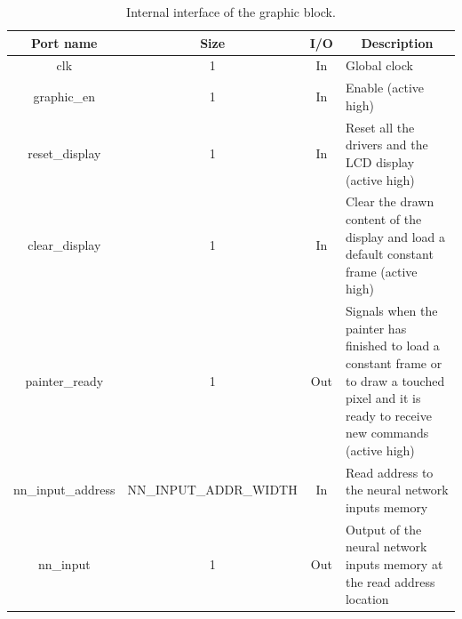 \documentclass[11pt]{report}
\begin{document}
\begin{table}[!h]
\renewcommand{\arraystretch}{1.5}
\centering
\begin{tabular}{|c|c|c|p{60mm}|}
\hline
\textbf{Port name}   & \textbf{Size}           & \textbf{I/O} & \multicolumn{1}{c|}{\textbf{Description}} \\ \hline
clk                  &  1                      & In & Global clock   \\ \hline
graphic\_en          &  1                      & In & Enable (active high)        \\ \hline
reset\_display       &  1                      & In & Reset all the drivers and the LCD display (active high)                     \\ \hline
clear\_display       &  1                      & In & Clear the drawn content of the display and load a default constant frame (active high)                      \\ \hline
painter\_ready       &  1                      & Out & Signals when the painter has finished to load a constant frame or to draw a touched pixel and it is ready to receive new commands (active high)                     \\ \hline
nn\_input\_address   &  NN\_INPUT\_ADDR\_WIDTH & In & Read address to the neural network inputs memory                      \\ \hline
nn\_input            &  1                      & Out & Output of the neural network inputs memory at the read address location                     \\ \hline

\end{tabular}
\label{tab:graphic_block_interface}
\caption{Internal interface of the graphic block.}
\end{table}
\end{document}
